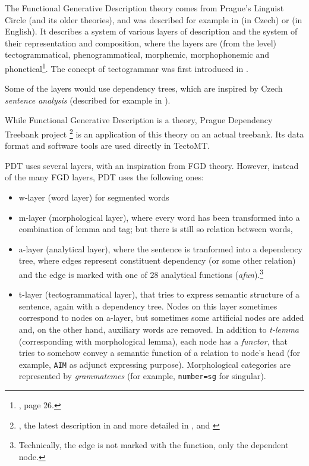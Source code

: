 The Functional Generative Description theory comes from Prague's Linguist Circle (and its older theories), and was described for example in \cite{sgallczech} (in Czech) or \cite{sgallenglish} (in English). It describes a system of various layers of description and the system of their representation and composition, where the layers are (from the  level) tectogrammatical, phenogrammatical, morphemic, morphophonemic and phonetical\footnote{\cite{sgallenglish}, page 26.}. The concept of tectogrammar was first introduced in \cite{curry}.

Some of the layers would use dependency trees, which are inspired by Czech \emph{sentence analysis} (described for example in \cite{smilauer}).

While Functional Generative Description is a theory, Prague Dependency Treebank project \footnote{\cite{pdt_soft}, the latest description in \cite{pdt_desc} and more detailed in \cite{pdt_manual_a}, \cite{pdt_manual_m} and \cite{pdt_manual_t}} is an application of this theory on an actual treebank. Its data format and software tools are used directly in TectoMT.

PDT uses several layers, with an inspiration from FGD theory. However, instead of the many FGD layers, PDT uses the following ones:
\begin{itemize}
\item w-layer (word layer) for segmented words
\item m-layer (morphological layer), where every word has been transformed into a combination of lemma and tag; but there is still so relation between words,
\item a-layer (analytical layer), where the sentence is tranformed into a dependency tree, where edges represent constituent dependency (or some other relation) and the edge is marked with one of 28 analytical functions (\emph{afun}).\footnote{Technically, the edge is not marked with the function, only the dependent node.}
\item t-layer (tectogrammatical layer), that tries to express semantic structure of a sentence, again with a dependency tree. Nodes on this layer sometimes correspond to nodes on a-layer, but sometimes some artificial nodes are added and, on the other hand, auxiliary words are removed. In addition to \emph{t-lemma} (corresponding with morphological lemma), each node has a \emph{functor}, that tries to somehow convey a semantic function of a relation to node's head (for example, \texttt{AIM} as adjunct expressing purpose). Morphological categories are represented by \emph{grammatemes} (for example, \texttt{number=sg} for singular).
\end{itemize}

